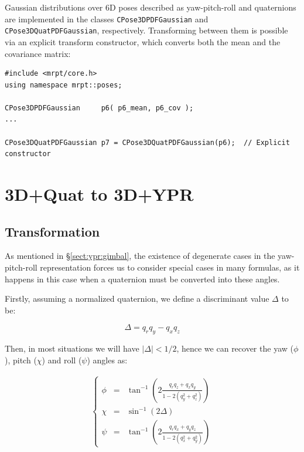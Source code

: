 \documentclass[a4paper,10pt]{report}
\begin{document}
Gaussian distributions over 6D poses described as yaw-pitch-roll and quaternions 
are implemented in the classes \texttt{CPose3DPDFGaussian} and \texttt{CPose3DQuatPDFGaussian}, respectively.
Transforming between them is possible via an explicit transform constructor, which 
converts both the mean and the covariance matrix:

\begin{lstlisting}
#include <mrpt/core.h> 
using namespace mrpt::poses; 

CPose3DPDFGaussian     p6( p6_mean, p6_cov ); 
...

CPose3DQuatPDFGaussian p7 = CPose3DQuatPDFGaussian(p6);  // Explicit constructor
\end{lstlisting}


\section{3D+Quat to 3D+YPR  }

\subsection{Transformation}

As mentioned in \S \ref{sect:ypr:gimbal}, the existence of degenerate cases in 
the yaw-pitch-roll representation forces us to consider special cases in many formulas, 
as it happens in this case when a quaternion must be converted into these angles.

Firstly, assuming a normalized quaternion, we define a discriminant value $\Delta$ to be:

\begin{equation}
 \Delta = q_r q_y - q_x q_z
\end{equation}

Then, in most situations we will have $|\Delta|<1/2$, hence we can recover the
yaw ($\phi$),
pitch ($\chi$) and roll ($\psi$) angles as:

\begin{eqnarray}
\left\{
\begin{array}{rcl}
 \phi &=& \tan^{-1} \left( 2 \frac{q_r q_z + q_x q_y}{1-2(q_y^2+q_z^2)}  \right) \nonumber \\
 \chi &=& \sin^{-1} \left( 2 \Delta \right) \label{eq:quat2ypr_1} \\
 \psi &=& \tan^{-1} \left( 2 \frac{q_r q_x + q_y q_z}{1-2(q_x^2+q_y^2)}  \right) \nonumber
\end{array}
\right.
\end{eqnarray}
\end{document}
